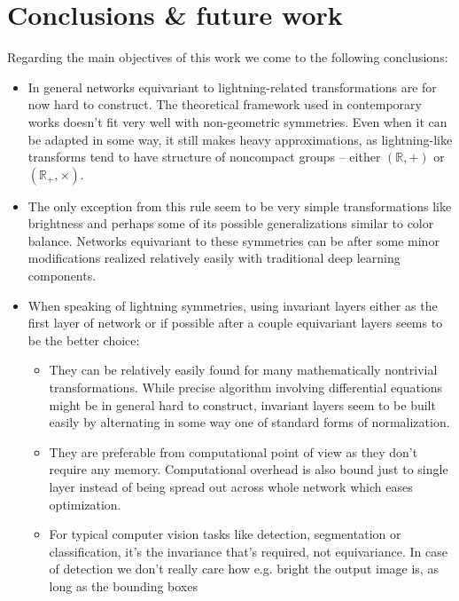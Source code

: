 \section{Conclusions \& future work}
Regarding the main objectives of this work we come to the following conclusions:
\begin{itemize}
    \item In general networks equivariant
        to lightning-related transformations are for now hard to
        construct. The theoretical framework used in contemporary works doesn't
        fit very well with non-geometric symmetries. Even when it can be adapted
        in some way, it still makes heavy approximations, as lightning-like transforms
        tend to have structure of noncompact groups -- either
        $(\mathbb{R},+)$ or $(\mathbb{R}_+, \times)$.
    \item The only exception from this rule seem to be very simple
        transformations like brightness and perhaps some of its
        possible generalizations similar to color balance.
        Networks equivariant to these symmetries can be
        after some minor modifications
        realized relatively easily with traditional deep learning components.
    \item When speaking of lightning symmetries,
        using invariant layers either as the first layer of network or
        if possible after a
        couple equivariant layers seems to be the better choice:
        \begin{itemize}
            \item They can be relatively easily found for many mathematically
                nontrivial transformations. While precise algorithm involving
                differential equations might be in general hard to construct,
                invariant layers seem to be built easily by alternating
                in some way one of standard forms of normalization.
            \item They are preferable from computational point of view
                as they don't require any memory. Computational overhead is also
                bound just to single layer instead of being spread out across
                whole network which eases optimization.
            \item For typical computer vision tasks like detection, segmentation
                or classification, it's the invariance that's required, not
                equivariance. In case of detection we don't really care how
                e.g. bright the output image is, as long as the bounding boxes

\end{itemize}
\end{itemize}
